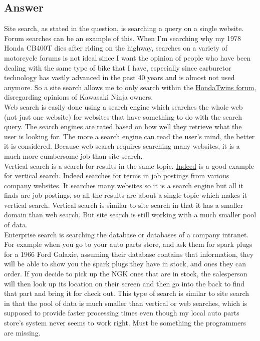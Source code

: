 \documentclass[10pt,letterpaper,bibliography=totoc]{scrartcl}
\begin{document}
\subsection{Answer}
Site search, as stated in the question, is searching a query on a single website. Forum searches can be an example of this. When I'm searching why my 1978 Honda CB400T dies after riding on the highway, searches on a variety of motorcycle forums is not ideal since I want the opinion of people who have been dealing with the same type of bike that I have, especially since carburetor technology has vastly advanced in the past 40 years and is almost not used anymore. So a site search allows me to only search within the \href{www.hondatwins.net}{HondaTwins forum}, disregarding opinions of Kawasaki Ninja owners.\\

Web search is easily done using a search engine which searches the whole web (not just one website) for websites that have something to do with the search query. The search engines are rated based on how well they retrieve what the user is looking for. The more a search engine can read the user's mind, the better it is considered. Because web search requires searching many websites, it is a much more cumbersome job than site search. \\

Vertical search is a search for results in the same topic. \href{www.indeed.com}{Indeed} is a good example for vertical search. Indeed searches for terms in job postings from various company websites. It searches many websites so it is a search engine but all it finds are job postings, so all the results are about a single topic which makes it vertical search. Vertical search is similar to site search in that it has a smaller domain than web search. But site search is still working with a much smaller pool of data. \\

Enterprise search is searching the database or databases of a company intranet. For example when you go to your auto parts store, and ask them for spark plugs for a 1966 Ford Galaxie, assuming their database contains that information, they will be able to show you the spark plugs they have in stock, and ones they can order. If you decide to pick up the NGK ones that are in stock, the salesperson will then look up its location on their screen and then go into the back to find that part and bring it for check out. This type of search is similar to site search in that the pool of data is much smaller than vertical or web searches, which is supposed to provide faster processing times even though my local auto parts store's system never seems to work right. Must be something the programmers are missing.
\end{document}
